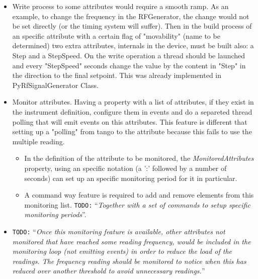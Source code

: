 \documentclass[a4paper,10pt]{article}
\newcommand{\todo}[1]{\texttt{\color{red}TODO:} ``\emph{#1}''}
\begin{document}
\begin{figure}[h]
\end{figure}

\begin{itemize}
    \item Write process to some attributes would require a smooth ramp. As an example, to change the frequency in the RFGenerator, the change would not be set directly (or the timing system will suffer). Then in the build process of an specific attribute with a certain flag of "movability" (name to be determined) two extra attributes, internals in the device, must be built also: a Step and a StepSpeed. On the write operation a thread should be launched and every "StepSpeed" seconds change the value by the content in "Step" in the direction to the final setpoint. This was already implemented in PyRfSignalGenerator Class.
    \item Monitor attributes. Having a property with a list of attributes, if they exist in the instrument definition, configure them in events and do a separeted thread polling that will emit events on this attributes. This feature is different that setting up a "polling" from tango to the attribute because this fails to use the multiple reading.
    \begin{itemize}
        \item In the definition of the attribute to be monitored, the \emph{MonitoredAttributes} property, using an specific notation (a ':' followed by a number of seconds) can set up an specific monitoring period for it in particular.
        \item A command way feature is required to add and remove elements from this monitoring list. \todo{Together with a set of commands to setup specific monitoring periods}.
    \end{itemize}
    \item \todo{Once this monitoring feature is available, other attributes not monitored that have reached some reading frequency, would be included in the monitoring loop (not emitting events) in order to reduce the load of the readings. The frequency reading should be monitored to notice when this has reduced over another threshold to avoid unnecessary readings.}
\end{itemize}
\end{document}
